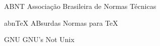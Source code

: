 \begin{siglas} \itemsep -1pt
  \item[ABNT] Associação Brasileira de Normas Técnicas
  \item[abnTeX] ABsurdas Normas para \TeX
  \item[GNU] GNU's Not Unix
\end{siglas}